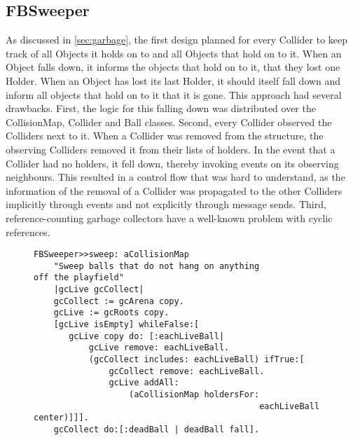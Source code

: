 \subsection{FBSweeper}
As discussed in \ref{sec:garbage}, the first design planned for every Collider to keep track of all Objects it holds on to and all Objects that hold on to it. When an Object falls down, it informs the objects that hold on to it, that they lost one Holder. When an Object has lost its last Holder, it should itself fall down and inform all objects that hold on to it that it is gone.
This approach had several drawbacks. First, the logic for this falling down was distributed over the CollisionMap, Collider and Ball classes.
Second, every Collider observed the Colliders next to it. When a Collider was removed from the structure, the observing Colliders removed it from their lists of holders. In the event that a Collider had no holders, it fell down, thereby invoking events on its observing neighbours.
This resulted in a control flow that was hard to understand, as the information of the removal of a Collider was propagated to the other Colliders implicitly through events and not explicitly through message sends.
Third, reference-counting garbage collectors have a well-known problem with cyclic references. 

\begin{figure}
  \begin{center}
\begin{lstlisting}[language=Smalltalk]
FBSweeper>>sweep: aCollisionMap
    "Sweep balls that do not hang on anything 
off the playfield"
    |gcLive gcCollect|
    gcCollect := gcArena copy.
    gcLive := gcRoots copy.
    [gcLive isEmpty] whileFalse:[
       gcLive copy do: [:eachLiveBall|
           gcLive remove: eachLiveBall.
           (gcCollect includes: eachLiveBall) ifTrue:[
               gcCollect remove: eachLiveBall.
               gcLive addAll:
                   (aCollisionMap holdersFor: 
                                             eachLiveBall center)]]].
    gcCollect do:[:deadBall | deadBall fall].
\end{lstlisting}
  \end{center}
  \caption{}
  \label{lst:sweep}
\end{figure}
